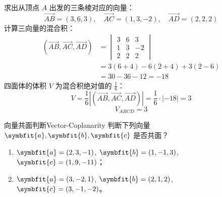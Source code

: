 \begin{solution}
    求出从顶点 $A$ 出发的三条棱对应的向量：
    \begin{equation}
        \overrightarrow{AB} = (3, 6, 3), \quad \overrightarrow{AC} = (1, 3, -2), \quad \overrightarrow{AD} = (2, 2, 2)
    \end{equation}
    计算三向量的混合积：
    \begin{equation}
        \begin{aligned}
            (\overrightarrow{AB}, \overrightarrow{AC}, \overrightarrow{AD}) & = \begin{vmatrix} 3 & 6 & 3 \\ 1 & 3 & -2 \\ 2 & 2 & 2 \end{vmatrix} \\
                                                                            & = 3(6 + 4) - 6(2 + 4) + 3(2 - 6)                                     \\
                                                                            & = 30 - 36 - 12 = -18
        \end{aligned}
    \end{equation}
    四面体的体积 $V$ 为混合积绝对值的 $\frac{1}{6}$：
    \begin{equation}
        V = \frac{1}{6} \left| (\overrightarrow{AB}, \overrightarrow{AC}, \overrightarrow{AD}) \right| = \frac{1}{6} \cdot |-18| = 3
    \end{equation}
    \begin{equation}
        \boxed{V_{ABCD} = 3}
    \end{equation}
\end{solution}


\begin{problem}{向量共面判断}{Vector-Coplanarity}
    判断下列向量 $\symbfit{a}, \symbfit{b}, \symbfit{c}$ 是否共面？
    \begin{enumerate}
        \item $\symbfit{a} = (2, 3, -1)$, $\symbfit{b} = (1, -1, 3)$, $\symbfit{c} = (1, 9, -11)$；
        \item $\symbfit{a} = (3, -2, 1)$, $\symbfit{b} = (2, 1, 2)$, $\symbfit{c} = (3, -1, -2)$。
    \end{enumerate}
\end{problem}

